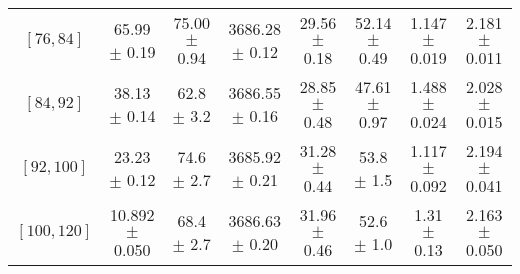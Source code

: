 \begin{tabular}{c||c|c|c|c|c|c|c}
$[76, 84]$ & 65.99 $\pm$ 0.19 & 75.00 $\pm$ 0.94 & 3686.28 $\pm$ 0.12 & 29.56 $\pm$ 0.18 & 52.14 $\pm$ 0.49 & 1.147 $\pm$ 0.019 & 2.181 $\pm$ 0.011\\
$[84, 92]$ & 38.13 $\pm$ 0.14 & 62.8 $\pm$ 3.2 & 3686.55 $\pm$ 0.16 & 28.85 $\pm$ 0.48 & 47.61 $\pm$ 0.97 & 1.488 $\pm$ 0.024 & 2.028 $\pm$ 0.015\\
$[92, 100]$ & 23.23 $\pm$ 0.12 & 74.6 $\pm$ 2.7 & 3685.92 $\pm$ 0.21 & 31.28 $\pm$ 0.44 & 53.8 $\pm$ 1.5 & 1.117 $\pm$ 0.092 & 2.194 $\pm$ 0.041\\
$[100, 120]$ & 10.892 $\pm$ 0.050 & 68.4 $\pm$ 2.7 & 3686.63 $\pm$ 0.20 & 31.96 $\pm$ 0.46 & 52.6 $\pm$ 1.0 & 1.31 $\pm$ 0.13 & 2.163 $\pm$ 0.050\\
\end{tabular}
